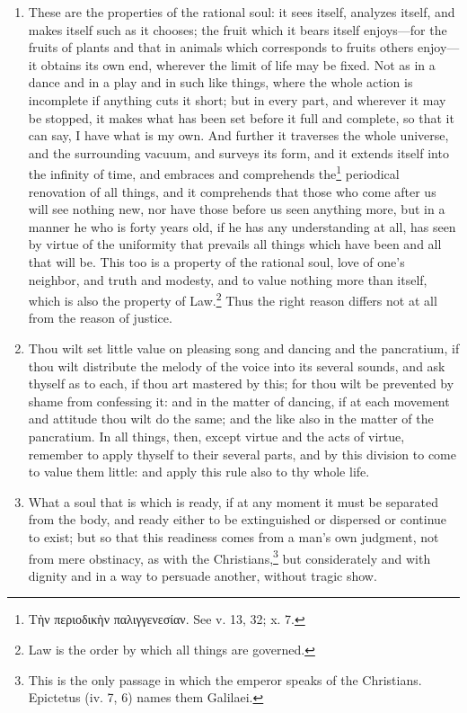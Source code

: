 \begin{enumerate}
\item These are the properties of the rational soul: it sees itself, analyzes itself, and makes itself such as it chooses; the fruit which it bears itself enjoys—for the fruits of plants and that in animals which corresponds to fruits others enjoy—it obtains its own end, wherever the limit of life may be fixed. Not as in a dance and in a play and in such like things, where the whole action is incomplete if anything cuts it short; but in every part, and wherever it may be stopped, it makes what has been set before it full and complete, so that it can say, I have what is my own. And further it traverses the whole universe, and the surrounding vacuum, and surveys its form, and it extends itself into the infinity of time, and embraces and comprehends the\footnote{\textgreek{Τὴν περιοδικὴν παλιγγενεσίαν}. See v. 13, 32; x. 7.} periodical renovation of all things, and it comprehends that those who come after us will see nothing new, nor have those before us seen anything more, but in a manner he who is forty years old, if he has any understanding at all, has seen by virtue of the uniformity that prevails all things which have been and all that will be. This too is a property of the rational soul, love of one's neighbor, and truth and modesty, and to value nothing more than itself, which is also the property of Law.\footnote{Law is the order by which all things are governed.} Thus the right reason differs not at all from the reason of justice.

\item Thou wilt set little value on pleasing song and dancing and the pancratium, if thou wilt distribute the melody of the voice into its several sounds, and ask thyself as to each, if thou art mastered by this; for thou wilt be prevented by shame from confessing it: and in the matter of dancing, if at each movement and attitude thou wilt do the same; and the like also in the matter of the pancratium. In all things, then, except virtue and the acts of virtue, remember to apply thyself to their several parts, and by this division to come to value them little: and apply this rule also to thy whole life.

\item What a soul that is which is ready, if at any moment it must be separated from the body, and ready either to be extinguished or dispersed or continue to exist; but so that this readiness comes from a man's own judgment, not from mere obstinacy, as with the Christians,\footnote{This is the only passage in which the emperor speaks of the Christians. Epictetus (iv. 7, 6) names them Galilaei.} but considerately and with dignity and in a way to persuade another, without tragic show.


\end{enumerate}
